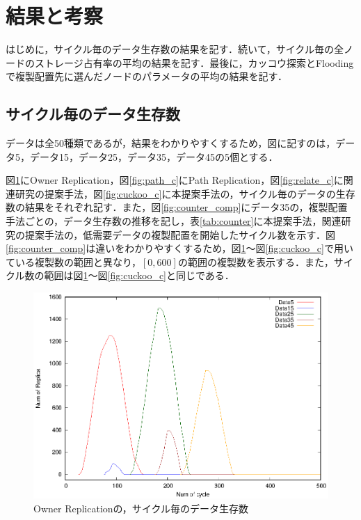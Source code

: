 \documentclass[11pt]{jreport}
\begin{document}
\section{結果と考察}
はじめに，サイクル毎のデータ生存数の結果を記す．続いて，サイクル毎の全ノードのストレージ占有率の平均の結果を記す．最後に，カッコウ探索とFloodingで複製配置先に選んだノードのパラメータの平均の結果を記す．

\subsection{サイクル毎のデータ生存数}
データは全50種類であるが，結果をわかりやすくするため，図に記すのは，データ5，データ15，データ25，データ35，データ45の5個とする．
\par 図\ref{fig:owner_c}にOwner Replication，図\ref{fig:path_c}にPath Replication，図\ref{fig:relate_c}に関連研究の提案手法，図\ref{fig:cuckoo_c}に本提案手法の，サイクル毎のデータの生存数の結果をそれぞれ記す．また，図\ref{fig:counter_comp}にデータ35の，複製配置手法ごとの，データ生存数の推移を記し，表\ref{tab:counter}に本提案手法，関連研究の提案手法の，低需要データの複製配置を開始したサイクル数を示す．図\ref{fig:counter_comp}は違いをわかりやすくするため，図\ref{fig:owner_c}〜図\ref{fig:cuckoo_c}で用いている複製数の範囲と異なり，$[0, 600]$の範囲の複製数を表示する．また，サイクル数の範囲は図\ref{fig:owner_c}〜図\ref{fig:cuckoo_c}と同じである．

\begin{figure}[H]
	\begin{center}
		\includegraphics[width=15.0cm]{./figure/owner_counter.eps}
	\end{center}
	\caption{Owner Replicationの，サイクル毎のデータ生存数}
	\label{fig:owner_c}
\end{figure}
\end{document}
